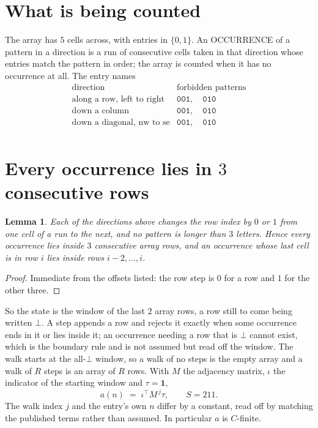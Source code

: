 \documentclass[11pt,a4paper]{article}
\theoremstyle{plain}
\newtheorem{lemma}[theorem]{Lemma}
\theoremstyle{definition}
\begin{document}
\section{What is being counted}

The array has $5$ cells across, with entries in $\{0,1\}$. An OCCURRENCE of a pattern in a
direction is a run of consecutive cells taken in that direction whose entries match the pattern
in order; the array is counted when it has no occurrence at all. The entry names
\[
\begin{array}{ll}
\text{direction} & \text{forbidden patterns} \\[2pt]
\text{along a row, left to right} & \mathtt{001},\quad \mathtt{010} \\
\text{down a column} & \mathtt{001},\quad \mathtt{010} \\
\text{down a diagonal, nw to se} & \mathtt{001},\quad \mathtt{010} \\
\end{array}
\]


\section{Every occurrence lies in $3$ consecutive rows}

\begin{lemma}\label{lem:win}
Each of the directions above changes the row index by $0$ or $1$ from one cell of a run to the
next, and no pattern is longer than $3$ letters. Hence every occurrence lies inside $3$
consecutive array rows, and an occurrence whose last cell is in row $i$ lies inside rows
$i-2,\dots,i$.
\end{lemma}

\begin{proof}
Immediate from the offsets listed: the row step is $0$ for a row and $1$ for the other three.
\end{proof}

So the state is the window of the last $2$ array rows, a row still to come being written
$\bot$. A step appends a row and rejects it exactly when some occurrence ends in it or lies
inside it; an occurrence needing a row that is $\bot$ cannot exist, which is the boundary rule
and is not assumed but read off the window. The walk starts at the all-$\bot$ window, so a walk
of no steps is the empty array and a walk of $R$ steps is an array of $R$ rows. With $M$ the
adjacency matrix, $\iota$ the indicator of the starting window and $\tau=\mathbf{1}$,
\[
a(n)\;=\;\iota^{\!\top}M^{\,j}\tau ,\qquad S=211.
\]
The walk index $j$ and the entry's own $n$ differ by a constant, read off by matching the
published terms rather than assumed. In particular $a$ is $C$-finite.
\end{document}
